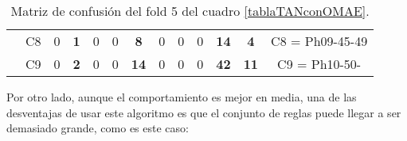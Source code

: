 \begin{table}[H]
{\begin{tabular}{|ccrrrrrrrrrrc|}
\multicolumn{1}{|c|}{}                                      & \multicolumn{1}{c|}{C8} & \multicolumn{1}{c|}{0}          & \multicolumn{1}{c|}{\textbf{1}} & \multicolumn{1}{c|}{0}  & \multicolumn{1}{c|}{0}  & \multicolumn{1}{c|}{\textbf{8}}  & \multicolumn{1}{c|}{0}  & \multicolumn{1}{c|}{0}  & \multicolumn{1}{c|}{0}  & \multicolumn{1}{c|}{\textbf{14}} & \multicolumn{1}{c|}{\textbf{4}}  & C8 = Ph09-45-49   \\ \cline{2-13}
\multicolumn{1}{|c|}{}                                      & \multicolumn{1}{c|}{C9} & \multicolumn{1}{c|}{0}          & \multicolumn{1}{c|}{\textbf{2}} & \multicolumn{1}{c|}{0}  & \multicolumn{1}{c|}{0}  & \multicolumn{1}{c|}{\textbf{14}} & \multicolumn{1}{c|}{0}  & \multicolumn{1}{c|}{0}  & \multicolumn{1}{c|}{0}  & \multicolumn{1}{c|}{\textbf{42}} & \multicolumn{1}{c|}{\textbf{11}} & C9 = Ph10-50-     \\ \hline
\end{tabular}%
}
\caption{Matriz de confusión del fold 5 del cuadro \ref{tablaTANconOMAE}.}
\end{table}


Por otro lado, aunque el comportamiento es mejor en media, una de las desventajas de usar este algoritmo es que el conjunto de reglas puede llegar a ser demasiado grande, como es este caso:

